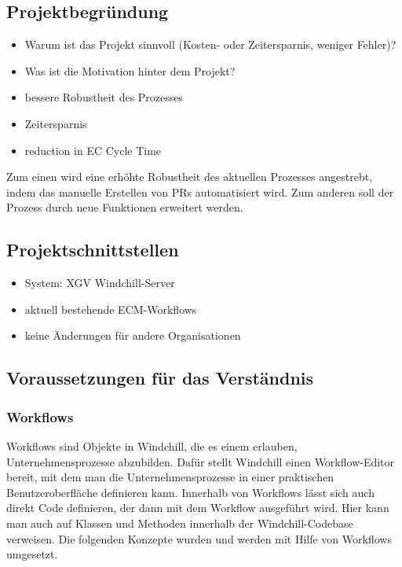 \subsection{Projektbegründung} 
\label{sec:Projektbegruendung}
\begin{itemize} %
	\item Warum ist das Projekt sinnvoll (\zB Kosten- oder Zeitersparnis, weniger Fehler)?
	\item Was ist die Motivation hinter dem Projekt?
\end{itemize}
\begin{itemize}
	\item bessere Robustheit des Prozesses
	\item Zeitersparnis
	\item reduction in EC Cycle Time
\end{itemize}
Zum einen wird eine erhöhte Robustheit des aktuellen Prozesses angestrebt, indem das manuelle Erstellen von \acp{PR} automatisiert wird.
Zum anderen soll der Prozess durch neue Funktionen erweitert werden.

\subsection{Projektschnittstellen}
\label{sec:Projektschnittstellen}
\begin{itemize}
	\item System: \ac{XGV} Windchill-Server
	\item aktuell bestehende \ac{ECM}-Workflows
	\item keine Änderungen für andere Organisationen
\end{itemize}

\subsection{Voraussetzungen für das Verständnis}
\label{subsec:VerstaendnisVoraussetzungen}

\subsubsection{Workflows}
Workflows sind Objekte in Windchill, die es einem erlauben, Unternehmensprozesse abzubilden.
Dafür stellt Windchill einen Workflow-Editor bereit, mit dem man die Unternehmensprozesse in einer praktischen Benutzeroberfläche definieren kann.
Innerhalb von Workflows lässt sich auch direkt Code definieren, der dann mit dem Workflow ausgeführt wird.
Hier kann man auch auf Klassen und Methoden innerhalb der Windchill-Codebase verweisen.
Die folgenden Konzepte wurden und werden mit Hilfe von Workflows umgesetzt.

